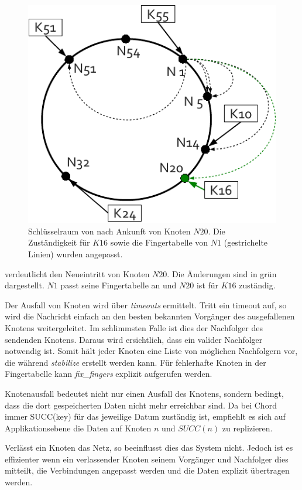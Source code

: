 \begin{figure}[htb]
\centering
\includegraphics{grafics/chord_new_node.pdf}
\caption{Schlüsselraum von  nach Ankunft von Knoten $N20$. Die Zuständigkeit für $K16$ sowie die Fingertabelle von $N1$ (gestrichelte Linien) wurden angepasst.}
\label{fig:chord_new_node}
\end{figure}

 verdeutlicht den Neueintritt von Knoten $N20$. Die Änderungen sind in grün dargestellt. $N1$ passt seine Fingertabelle an und $N20$ ist für $K16$ zuständig.

Der Ausfall von Knoten wird über \emph{timeouts} ermittelt. Tritt ein timeout auf, so wird die Nachricht einfach an den besten bekannten Vorgänger des ausgefallenen Knotens weitergeleitet. Im schlimmsten Falle ist dies der Nachfolger des sendenden Knotens. Daraus wird ersichtlich, dass ein valider Nachfolger notwendig ist. Somit hält jeder Knoten eine Liste von möglichen Nachfolgern vor, die während \emph{stabilize} erstellt werden kann. Für fehlerhafte Knoten in der Fingertabelle kann \emph{fix\_fingers} explizit aufgerufen werden.

Knotenausfall bedeutet nicht nur einen Ausfall des Knotens, sondern bedingt, dass die dort gespeicherten Daten nicht mehr erreichbar sind. Da bei Chord immer SUCC(key) für das jeweilige Datum zuständig ist, empfiehlt es sich auf Applikationsebene die Daten auf Knoten $n$ und $SUCC(n)$ zu replizieren.

Verlässt ein Knoten das Netz, so beeinflusst dies das System nicht. Jedoch ist es effizienter wenn ein verlassender Knoten seinem Vorgänger und Nachfolger dies mitteilt, die Verbindungen angepasst werden und die Daten explizit übertragen werden.


